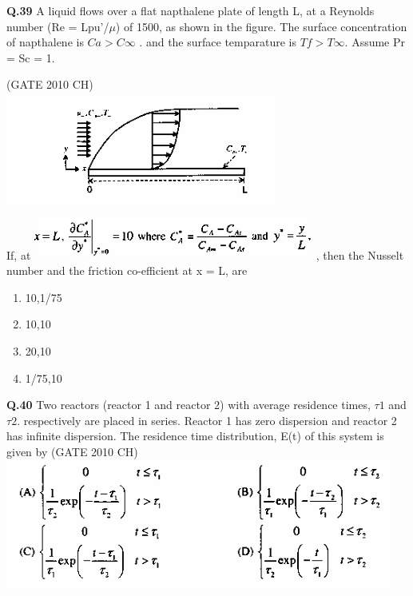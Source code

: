 \documentclass[journal,12pt,onecolumn]{exam}
\theoremstyle{remark}
\begin{document}
\noindent
\textbf{Q.39}
 A liquid flows over a flat napthalene plate of length L, at a Reynolds number (Re = Lpu'/$\mu$) of 1500, as shown in the figure. The surface concentration of napthalene is $Ca > C\infty$ . and the surface temparature is $Tf > T\infty$. Assume Pr = Sc = 1.

 \hfill{(GATE 2010 CH)}\\
 \includegraphics[width=0.5\linewidth]{images/Q.39 image.png}\\
 
   If, at \includegraphics[width=0.5\linewidth]{images/Q.39 image-2.png} , then the Nusselt number and the friction co-efficient at x = L, are

    \begin{enumerate}
        \item 10,1/75
        \item 10,10
        \item 20,10
        \item 1/75,10
        
    \end{enumerate}

   \noindent
   \textbf{Q.40}
   Two reactors (reactor 1 and reactor 2) with average residence times, $\tau1$ and $\tau2$. respectively are placed in series. Reactor 1 has zero dispersion and reactor 2 has infinite dispersion. The residence time distribution, E(t) of this system is given by
    \hfill{(GATE 2010 CH)}\\

\includegraphics[width=1.0\linewidth]{images/Q.40 options.png}
   
\end{document}
